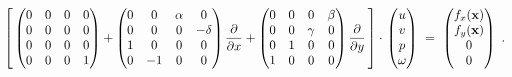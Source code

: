 \begin{equation}
	\left[ \,
	\begin{pmatrix}
		0 & 0 & 0 & 0 \\
		0 & 0 & 0 & 0 \\
		0 & 0 & 0 & 0 \\
		0 & 0 & 0 & 1
	\end{pmatrix} +
	\begin{pmatrix}
		0 & 0 & \alpha & 0 \\
		0 & 0 & 0 & -\delta \\
		1 & 0 & 0 & 0 \\
		0 & -1 & 0 & 0
	\end{pmatrix} \frac{\pd}{\pd x} +
	\begin{pmatrix}
		0 & 0 & 0 & \beta \\
		0 & 0 & \gamma & 0 \\
		0 & 1 & 0 & 0 \\
		1 & 0 & 0 & 0 \\
	\end{pmatrix} \frac{\pd}{\pd y} \, \right]
	\mkern0mu \cdot \mkern2mu
	\begin{pmatrix}
		u \\ v \\ p \\ \omega
	\end{pmatrix}
	\ = \
	\begin{pmatrix}
		f_x(\mathbf{x}) \\ f_y(\mathbf{x}) \\ 0 \\ 0
	\end{pmatrix} \ .
	\vspace{1mm}
\end{equation}